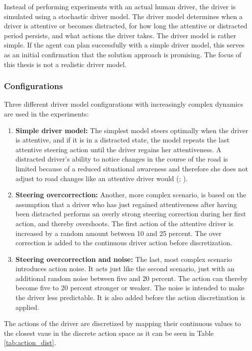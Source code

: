 Instead of performing experiments with an actual human driver, the driver is simulated using a stochastic driver model. The driver model determines when a driver is attentive or becomes distracted, for how long the attentive or distracted period persists, and what actions the driver takes. The driver model is rather simple. If the agent can plan successfully with a simple driver model, this serves as an initial confirmation that the solution approach is promising. The focus of this thesis is not a realistic driver model.


\subsubsection{Configurations}

Three different driver model configurations with increasingly complex dynamics are used in the experiments:
\begin{enumerate}
    \item \textbf{Simple driver model:} The simplest model steers optimally when the driver is attentive, and if it is in a distracted state, the model repeats the last attentive steering action until the driver regains her attentiveness. A distracted driver's ability to notice changes in the course of the road is limited because of a reduced situational awareness and therefore she does not adjust to road changes like an attentive driver would (\cite{driver-awareness}; \cite{driver-awareness2}).
    \item \textbf{Steering overcorrection:} Another, more complex scenario, is based on the assumption that a driver who has just regained attentiveness after having been distracted performs an overly strong steering correction during her first action, and thereby overshoots. The first action of the attentive driver is increased by a random amount between 10 and 25 percent. The over correction is added to the continuous driver action before discretization.
    \item \textbf{Steering overcorrection and noise:} The last, most complex scenario introduces action noise. It acts just like the second scenario, just with an additional random noise between five and 20 percent. The action can thereby become five to 20 percent stronger or weaker. The noise is intended to make the driver less predictable. It is also added before the action discretization is applied.
\end{enumerate}
\label{sec:driver_act_discr}
The actions of the driver are discretized by mapping their continuous values to the closest vaue in the discrete action space as it can be seen in Table \ref{tab:action_dist}.

